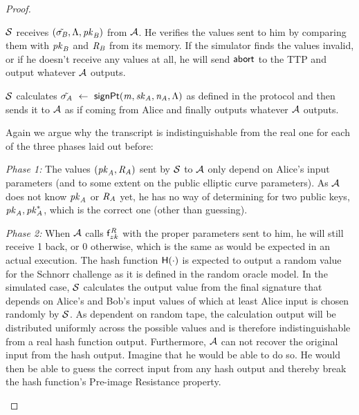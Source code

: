 \begin{proof}
\begin{asparaenum}
        \item $\mathcal{S}$ receives $(\tilde{\sigma_{\mathit{B}}}, \Lambda, \mathit{pk}_{\mathit{B}})$ from $\mathcal{A}$.
        He verifies the values sent to him by comparing them with $\mathit{pk}_{\mathit{B}}$ and $\mathit{R}_{\mathit{B}}$ from its memory.
        If the simulator finds the values invalid, or if he doesn't receive any values at all, he will send $\mathsf{abort}$ to the TTP and output whatever $\mathcal{A}$ outputs.
        \item $\mathcal{S}$ calculates $\tilde{\sigma_{\mathit{A}}} ~\leftarrow~ \mathsf{signPt}(\mathit{m}, \mathit{sk}_{\mathit{A}}, \mathit{\mathit{n}_{\mathit{A}}}, \Lambda)$ as defined in the protocol and then sends it to $\mathcal{A}$ as if coming from Alice and finally outputs whatever $\mathcal{A}$ outputs.
    \end{asparaenum}
    Again we argue why the transcript is indistinguishable from the real one for each of the three phases laid out before:
    \begin{asparaitem}
        \item \textit{Phase 1: } The values $(\mathit{pk}_{\mathit{A}}, \mathit{R}_{\mathit{A}})$ sent by $\mathcal{S}$ to $\mathcal{A}$ only depend on Alice's input parameters (and to some extent on the public elliptic curve parameters).
        As $\mathcal{A}$ does not know $\mathit{pk}_{\mathit{A}}$ or $\mathit{R}_{\mathit{A}}$ yet, he has no way of determining for two public keys, $\mathit{pk}_{\mathit{A}}, \mathit{pk}_{\mathit{A}}^*$, which is the correct one (other than guessing).
        \item \textit{Phase 2: } When $\mathcal{A}$ calls $\mathsf{f}^{\mathit{R}}_{zk}$ with the proper parameters sent to him, he will still receive 1 back, or 0 otherwise, which is the same as would be expected in an actual execution.
        The hash function $\mathsf{H} (\cdot)$ is expected to output a random value for the Schnorr challenge as it is defined in the random oracle model.
        In the simulated case, $\mathcal{S}$ calculates the output value from the final signature that depends on Alice's and Bob's input values of which at least Alice input is chosen randomly by $\mathcal{S}$.
        As dependent on random tape, the calculation output will be distributed uniformly across the possible values and is therefore indistinguishable from a real hash function output.
        Furthermore, $\mathcal{A}$ can not recover the original input from the hash output.
        Imagine that he would be able to do so. He would then be able to guess the correct input from any hash output and thereby break the hash function's Pre-image Resistance property.

\end{asparaitem}
\end{proof}
